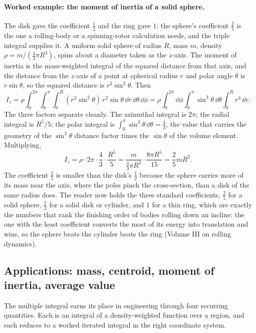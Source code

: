 \paragraph{Worked example: the moment of inertia of a solid sphere.}
The disk gave the coefficient $\tfrac{1}{2}$ and the ring gave $1$;
the sphere's coefficient $\tfrac{2}{5}$ is the one a rolling-body or a
spinning-rotor calculation needs, and the triple integral supplies it.
A uniform solid sphere of radius $R$, mass $m$, density $\rho =
m/(\tfrac{4}{3}\pi R^{3})$, spins about a diameter taken as the
$z$-axis. The moment of inertia is the mass-weighted integral of the
squared distance from that axis, and the distance from the $z$-axis of
a point at spherical radius $r$ and polar angle $\theta$ is $r\sin
\theta$, so the squared distance is $r^{2}\sin^{2}\theta$. Then
\[
I_{z} = \rho\int_{0}^{2\pi}\!\int_{0}^{\pi}\!\int_{0}^{R}
(r^{2}\sin^{2}\theta)\,r^{2}\sin\theta\,\dd r\,\dd\theta\,\dd\phi
= \rho\int_{0}^{2\pi}\!\dd\phi\int_{0}^{\pi}\!\sin^{3}\theta\,\dd\theta
\int_{0}^{R}\! r^{4}\,\dd r.
\]
The three factors separate cleanly. The azimuthal integral is $2\pi$;
the radial integral is $R^{5}/5$; the polar integral is $\int_{0}^{\pi}
\sin^{3}\theta\,\dd\theta = \tfrac{4}{3}$, the value that carries the
geometry of the $\sin^{2}\theta$ distance factor times the $\sin
\theta$ of the volume element. Multiplying,
\[
I_{z} = \rho\cdot 2\pi\cdot\frac{4}{3}\cdot\frac{R^{5}}{5}
= \frac{m}{\tfrac{4}{3}\pi R^{3}}\cdot\frac{8\pi R^{5}}{15}
= \frac{2}{5} m R^{2}.
\]
The coefficient $\tfrac{2}{5}$ is smaller than the disk's
$\tfrac{1}{2}$ because the sphere carries more of its mass near the
axis, where the poles pinch the cross-section, than a disk of the same
radius does. The reader now holds the three standard coefficients,
$\tfrac{2}{5}$ for a solid sphere, $\tfrac{1}{2}$ for a solid disk or
cylinder, and $1$ for a thin ring, which are exactly the numbers that
rank the finishing order of bodies rolling down an incline: the one
with the least coefficient converts the most of its energy into
translation and wins, so the sphere beats the cylinder beats the ring
(Volume III on rolling dynamics).

\subsection{Applications: mass, centroid, moment of inertia,
average value}

The multiple integral earns its place in engineering through four
recurring quantities. Each is an integral of a density-weighted
function over a region, and each reduces to a worked iterated
integral in the right coordinate system.


